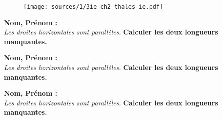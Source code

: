 \documentclass[12pt]{article}
\begin{document}

  \begin{figure}[H]
    \centering
    \texttt{[image: sources/1/3ie\_ch2\_thales-ie.pdf]}
  \end{figure}


\begin{multicols}{3}

\textbf{Nom, Prénom :}\\

\textit{Les droites horizontales sont parallèles.} \textbf{Calculer les deux longueurs manquantes.}

\textbf{Nom, Prénom :}\\

\textit{Les droites horizontales sont parallèles.} \textbf{Calculer les deux longueurs manquantes.}

\textbf{Nom, Prénom :}\\

\textit{Les droites horizontales sont parallèles.} \textbf{Calculer les deux longueurs manquantes.}


\end{multicols}
\end{document}
